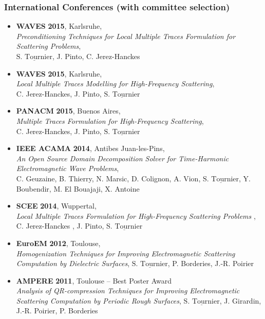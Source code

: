 \documentclass[a4paper,10pt,twoside]{article}
\newcommand\moi{$\underline{\textrm{S. Tournier}}$}
\begin{document}
\subsubsection*{International Conferences (with committee selection)}
\noindent
\begin{itemize}
\item[\textbullet]
  \textbf{WAVES} \textbf{2015}, Karlsruhe,\\
  \emph{Preconditioning Techniques
    for Local Multiple Traces Formulation for Scattering Problems},\\
  \moi,  J. Pinto, C. Jerez-Hanckes
\item[\textbullet]
  \textbf{WAVES} \textbf{2015}, Karlsruhe,\\
  \emph{Local Multiple Traces Modelling for High-Frequency Scattering},\\
  C. Jerez-Hanckes, J. Pinto, \moi
\item[\textbullet]
  \textbf{PANACM} \textbf{2015}, Buenos Aires,\\
  \emph{Multiple Traces Formulation for High-Frequency Scattering},\\
  C. Jerez-Hanckes, J. Pinto, \moi
\item[\textbullet]
\textbf{IEEE ACAMA} \textbf{2014}, Antibes Juan-les-Pins,\\
\emph{An Open Source Domain Decomposition Solver for
Time-Harmonic Electromagnetic Wave Problems},\\
C. Geuzaine, B. Thierry, N. Marsic, D. Colignon, A. Vion, \moi,
Y. Boubendir, M. El Bouajaji, X. Antoine
\item[\textbullet]
\textbf{SCEE} \textbf{2014}, Wuppertal,\\
\emph{Local Multiple Traces Formulation for High-Frequency Scattering Problems} ,\\
 C. Jerez-Hanckes , J. Pinto, \moi
\item[\textbullet]
\textbf{EuroEM} \textbf{2012}, Toulouse,\\
\emph{Homogenization  Techniques for Improving Electromagnetic
  Scattering Computation by Dielectric Surfaces},
\moi, P. Borderies, J.-R. Poirier
\item[\textbullet]
\textbf{AMPERE}
\textbf{2011}, Toulouse
-- \textsf{Best Poster Award}\\
\emph{Analysis of QR-compression
Techniques for Improving Electromagnetic Scattering Computation by
Periodic Rough Surfaces},
\moi, J. Girardin, J.-R. Poirier, P. Borderies


\end{itemize}
\end{document}
